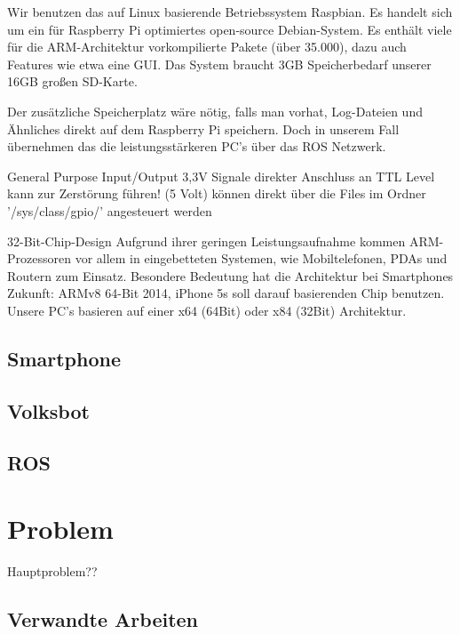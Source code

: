 \documentclass[12pt]{article}
\begin{document}
Wir benutzen das auf Linux basierende Betriebssystem Raspbian.
Es handelt sich um ein für Raspberry Pi optimiertes open-source Debian-System.
Es enthält viele für die ARM-Architektur vorkompilierte Pakete (über 35.000), dazu auch Features wie etwa eine GUI.
Das System braucht 3GB Speicherbedarf unserer 16GB großen SD-Karte.

Der zusätzliche Speicherplatz wäre nötig, falls man vorhat, Log-Dateien und Ähnliches direkt auf dem Raspberry Pi speichern. 
Doch in unserem Fall übernehmen das die leistungsstärkeren PC's über das ROS Netzwerk.

General Purpose Input/Output
3,3V Signale
direkter Anschluss an TTL Level kann zur Zerstörung führen! (5 Volt)
können direkt über die Files im Ordner '/sys/class/gpio/' angesteuert werden


32-Bit-Chip-Design
Aufgrund ihrer geringen Leistungsaufnahme kommen ARM-Prozessoren vor allem in eingebetteten Systemen, wie Mobiltelefonen, PDAs und Routern zum Einsatz.
Besondere Bedeutung hat die Architektur bei Smartphones
Zukunft: ARMv8 64-Bit 2014, iPhone 5s soll darauf basierenden Chip benutzen.
Unsere PC's basieren auf einer x64 (64Bit) oder x84 (32Bit) Architektur.


\subsection{Smartphone}

\subsection{Volksbot}

\subsection{ROS}



\section{Problem}

Hauptproblem??

\subsection{Verwandte Arbeiten}
\end{document}
